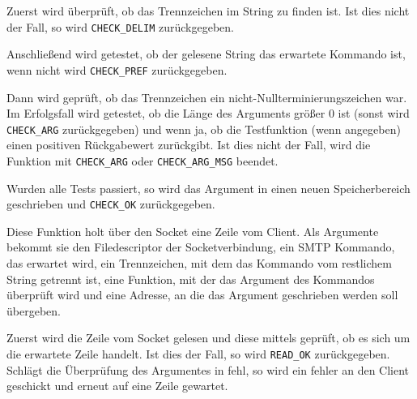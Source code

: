 Zuerst wird \"{u}berpr\"{u}ft, ob das Trennzeichen im String zu finden ist. Ist dies nicht der Fall, so wird \texttt{CHECK\_DELIM} zur\"{u}ckgegeben.

Anschließend wird getestet, ob der gelesene String das erwartete Kommando ist, wenn nicht wird \texttt{CHECK\_PREF} zur\"{u}ckgegeben.

Dann wird gepr\"{u}ft, ob das Trennzeichen ein nicht-Nullterminierungszeichen war. Im Erfolgsfall wird getestet, ob die L\"{a}nge des Arguments gr\"{o}ßer 0 ist (sonst wird \texttt{CHECK\_ARG} zur\"{u}ckgegeben) und wenn ja, ob die Testfunktion (wenn angegeben) einen positiven R\"{u}ckgabewert zur\"{u}ckgibt. Ist dies nicht der Fall, wird die Funktion mit \texttt{CHECK\_ARG} oder \texttt{CHECK\_ARG\_MSG} beendet.

Wurden alle Tests passiert, so wird das Argument in einen neuen Speicherbereich geschrieben und \texttt{CHECK\_OK} zur\"{u}ckgegeben.

\label{fn:smtp_fetch_input_line}
Diese Funktion holt \"{u}ber den Socket eine Zeile vom Client. Als Argumente bekommt sie den Filedescriptor der Socketverbindung, ein SMTP Kommando, das erwartet wird, ein Trennzeichen, mit dem das Kommando vom restlichem String getrennt ist, eine Funktion, mit der das Argument des Kommandos \"{u}berpr\"{u}ft wird und eine Adresse, an die das Argument geschrieben werden soll \"{u}bergeben.

Zuerst wird die Zeile vom Socket gelesen und diese mittels  gepr\"{u}ft, ob es sich um die erwartete Zeile handelt. Ist dies der Fall, so wird \texttt{READ\_OK} zur\"{u}ckgegeben. Schl\"{a}gt die \"{U}berpr\"{u}fung des Argumentes in  fehl, so wird ein fehler an den Client geschickt und erneut auf eine Zeile gewartet.

